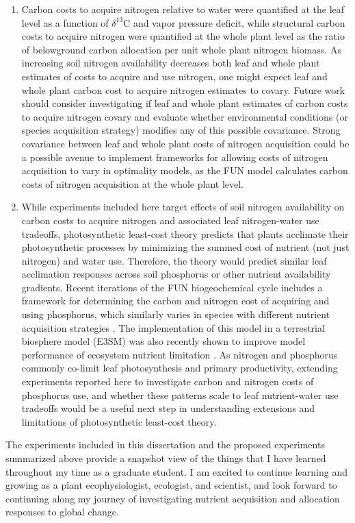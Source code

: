 \begin{enumerate}
    \item Carbon costs to acquire nitrogen relative to water were quantified at the leaf level as a function of $\delta^{13}$C and vapor pressure deficit, while structural carbon costs to acquire nitrogen were quantified at the whole plant level as the ratio of belowground carbon allocation per unit whole plant nitrogen biomass. As increasing soil nitrogen availability decreases both leaf and whole plant estimates of costs to acquire and use nitrogen, one might expect leaf and whole plant carbon cost to acquire nitrogen estimates to covary. Future work should consider investigating if leaf and whole plant estimates of carbon costs to acquire nitrogen covary and evaluate whether environmental conditions (or species acquisition strategy) modifies any of this possible covariance. Strong covariance between leaf and whole plant costs of nitrogen acquisition could be a possible avenue to implement frameworks for allowing costs of nitrogen acquisition to vary in optimality models, as the FUN model calculates carbon costs of nitrogen acquisition at the whole plant level.
    
    \item While experiments included here target effects of soil nitrogen availability on carbon costs to acquire nitrogen and associated leaf nitrogen-water use tradeoffs, photosynthetic least-cost theory predicts that plants acclimate their photosynthetic processes by minimizing the summed cost of nutrient (not just nitrogen) and water use. Therefore, the theory would predict similar leaf acclimation responses across soil phosphorus or other nutrient availability gradients. Recent iterations of the FUN biogeochemical cycle includes a framework for determining the carbon and nitrogen cost of acquiring and using phosphorus, which similarly varies in species with different nutrient acquisition strategies . The implementation of this model in a terrestrial biosphere model (E3SM) was also recently shown to improve model performance of ecosystem nutrient limitation . As nitrogen and phosphorus commonly co-limit leaf photosynthesis and primary productivity, extending experiments reported here to investigate carbon and nitrogen costs of phosphorus use, and whether these patterns scale to leaf nutrient-water use tradeoffs would be a useful next step in understanding extensions and limitations of photosynthetic least-cost theory.
\end{enumerate}

\noindent The experiments included in this dissertation and the proposed experiments summarized above provide a snapshot view of the things that I have learned throughout my time as a graduate student. I am excited to continue learning and growing as a plant ecophysiologist, ecologist, and scientist, and look forward to continuing along my journey of investigating nutrient acquisition and allocation responses to global change.